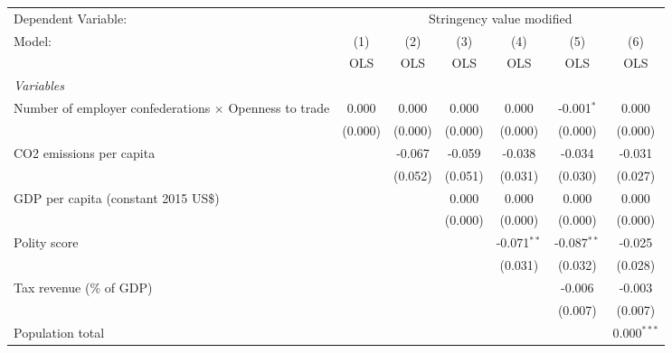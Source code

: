 
\begingroup
\centering
\begin{tabular}{lcccccc}
   \toprule
   Dependent Variable: & \multicolumn{6}{c}{Stringency value modified}\\
   Model:                                                        & (1)     & (2)     & (3)     & (4)           & (5)           & (6)\\  
                                                                 &  OLS    & OLS     & OLS     & OLS           & OLS           & OLS\\  
   \midrule
   \emph{Variables}\\
   Number of employer confederations $\times$ Openness to trade  & 0.000   & 0.000   & 0.000   & 0.000         & -0.001$^{*}$  & 0.000\\   
                                                                 & (0.000) & (0.000) & (0.000) & (0.000)       & (0.000)       & (0.000)\\   
   CO2 emissions per capita                                      &         & -0.067  & -0.059  & -0.038        & -0.034        & -0.031\\   
                                                                 &         & (0.052) & (0.051) & (0.031)       & (0.030)       & (0.027)\\   
   GDP per capita (constant 2015 US\$)                           &         &         & 0.000   & 0.000         & 0.000         & 0.000\\   
                                                                 &         &         & (0.000) & (0.000)       & (0.000)       & (0.000)\\   
   Polity score                                                  &         &         &         & -0.071$^{**}$ & -0.087$^{**}$ & -0.025\\   
                                                                 &         &         &         & (0.031)       & (0.032)       & (0.028)\\   
   Tax revenue (\% of GDP)                                       &         &         &         &               & -0.006        & -0.003\\   
                                                                 &         &         &         &               & (0.007)       & (0.007)\\   
   Population total                                              &         &         &         &               &               & 0.000$^{***}$\\   

\end{tabular}
